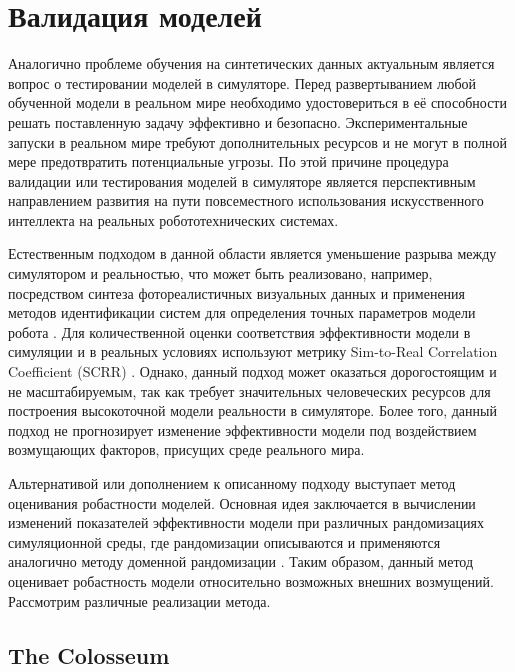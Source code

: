     \section{Валидация моделей}
    
    Аналогично проблеме обучения на синтетических данных актуальным является вопрос о тестировании моделей в симуляторе. Перед развертыванием любой обученной модели в реальном мире необходимо удостовериться в её способности решать поставленную задачу эффективно и безопасно. Экспериментальные запуски в реальном мире требуют дополнительных ресурсов и не могут в полной мере предотвратить потенциальные угрозы. По этой причине процедура валидации или тестирования моделей в симуляторе является перспективным направлением развития на пути повсеместного использования искусственного интеллекта на реальных робототехнических системах. 

    Естественным подходом в данной области является уменьшение разрыва между симулятором и реальностью, что может быть реализовано, например, посредством синтеза фотореалистичных визуальных данных и применения методов идентификации систем для определения точных параметров модели робота \cite{li24simpler}. Для количественной оценки соответствия эффективности модели в симуляции и в реальных условиях используют метрику Sim-to-Real Correlation Coefficient (SCRR) \cite{kadian2020sim2real}. Однако, данный подход может оказаться дорогостоящим и не масштабируемым, так как требует значительных человеческих ресурсов для построения высокоточной модели реальности в симуляторе. Более того, данный подход не прогнозирует изменение эффективности модели под воздействием возмущающих факторов, присущих среде реального мира.

    Альтернативой или дополнением к описанному подходу выступает метод оценивания робастности моделей. Основная идея заключается в вычислении изменений показателей эффективности модели при различных рандомизациях симуляционной среды, где рандомизации описываются и применяются аналогично методу доменной рандомизации \cite{pumacay2024colosseum, li24simpler}. Таким образом, данный метод оценивает робастность модели относительно возможных внешних возмущений. Рассмотрим различные реализации метода.

        \subsection{The Colosseum}
    
